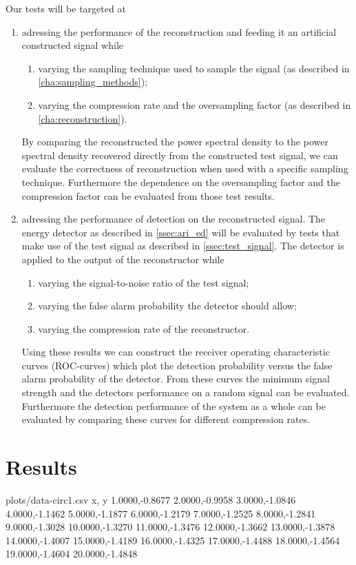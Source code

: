 \documentclass[a4paper, openany, oneside]{memoir}
\begin{document}
Our tests will be targeted at
\begin{enumerate}
	\item adressing the performance of the reconstruction and feeding it an artificial constructed signal while
	\begin{enumerate}
		\item varying the sampling technique used to sample the signal (as described in \cref{cha:sampling_methods});
		\item varying the compression rate and the oversampling factor (as described in \cref{cha:reconstruction}).
	\end{enumerate}
	By comparing the reconstructed the power spectral density to the power spectral density recovered directly from the constructed test signal, we can evaluate the correctness of reconstruction when used with a specific sampling technique.
	Furthermore the dependence on the oversampling factor and the compression factor can be evaluated from those test results. 
	\item adressing the performance of detection on the reconstructed signal. The energy detector as described in \cref{ssec:ari_ed} will be evaluated by tests that make use of the test signal as described in \cref{ssec:test_signal}. 
	The detector is applied to the output of the reconstructor while	
	\begin{enumerate}
		\item varying the signal-to-noise ratio of the test signal; 
		\item varying the false alarm probability the detector 
		should allow;
		\item varying the compression rate of the reconstructor.
	\end{enumerate}
	Using these results we can construct the receiver operating characteristic curves (ROC-curves) which plot the detection probability versus the false alarm probability of the detector. From these curves the minimum signal strength and the detectors performance on a random signal can be evaluated. Furthermore the detection performance of the system as a whole can be evaluated by comparing these curves for different compression rates.
	\end{enumerate}

\section{Results}


\begin{filecontents*}{plots/data-circ1.csv}
x, y
1.0000,-0.8677
2.0000,-0.9958
3.0000,-1.0846
4.0000,-1.1462
5.0000,-1.1877
6.0000,-1.2179
7.0000,-1.2525
8.0000,-1.2841
9.0000,-1.3028
10.0000,-1.3270
11.0000,-1.3476
12.0000,-1.3662
13.0000,-1.3878
14.0000,-1.4007
15.0000,-1.4189
16.0000,-1.4325
17.0000,-1.4488
18.0000,-1.4564
19.0000,-1.4604
20.0000,-1.4848
\end{filecontents*}
\end{document}
